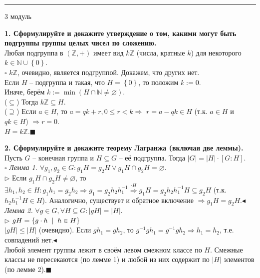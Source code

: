 \documentclass[11pt,a4paper]{article}
\newcommand{\N}{\mathbb{N}}
\newcommand{\Z}{\mathbb{Z}}
\renewcommand{\mid}{\hspace{2mm}\middle|\hspace{2mm}}
\newcommand{\proof}{$\square$ }
\newcommand{\qed}{\hfill$\blacksquare$}
\begin{document}
\rule{\linewidth}{0.3mm}

\vspace{1mm}
\begin{center}
\begin{LARGE}
\textsf{3 модуль}
\end{LARGE}
\end{center}
\vspace{1mm}

\textbf{1. Сформулируйте и докажите утверждение о том, какими могут быть подгруппы группы целых чисел по сложению.\\}
Любая подгруппа в $\left( \Z, + \right)$ имеет вид $k\Z$ (числа, кратные $k$) для некоторого $k \in \N \cup \left\{ 0 \right\}$.\\
\proof $k\Z$, очевидно, является подгруппой. Докажем, что других нет.\\
Если $H$ -- подгруппа и такая, что $H = \left\{ 0 \right\}$, то положим $k := 0$.\\
Иначе, берём $k := \min\left(H \cap \N \neq \varnothing \right)$.\\
($\subseteq$) Тогда $k\Z \subseteq H$.\\
($\supseteq$) Если $a \in H$, то $a = qk + r, 0 \leq r < k \Rightarrow$ $r = a - qk \in H$ (т.к. $a \in H$ и $qk \in H$) $\Rightarrow r = 0$.\\
$H = k\Z$.\qed

\textbf{2. Сформулируйте и докажите теорему Лагранжа (включая две леммы).\\}
Пусть $G$ -- конечная группа и $H \subseteq G$ -- её подгруппа. Тогда $\left\vert G \right\vert = \left\vert H \right\vert \cdot \left[ G : H \right]$.\\
\proof \textit{Лемма 1.} $\forall g_1, g_2 \in G: g_1 H = g_2 H \vee g_1 H \cap g_2 H = \varnothing$.\\
$\triangleright$ Если $g_1 H \cap g_2 H \neq \varnothing$, то $\exists h_1, h_2 \in H : g_1 h_1 = g_2 h_2 \Rightarrow g_1 = g_2 h_2 h_1^{-1} \stackrel{\cdot H}{\Rightarrow} g_1 H = g_2 h_2 h_1^{-1} H \subseteq g_2 H$ (т.к. $h_2 h_1^{-1} H \in H$). Аналогично, существует и обратное включение $\Rightarrow g_1 H = g_2 H$.\hfill$\blacktriangleleft$ \\
\textit{Лемма 2.} $\forall g \in G, \forall H \subseteq G: |gH| = |H|$.\\
$\triangleright$ $gH = \left\{g \cdot h \mid h \in H \right\}$\\
$\left\vert gH \right\vert \leq \left\vert H \right\vert$ (очевидно). Если $g h_1 = g h_2$, то $g^{-1} g h_1 = g^{-1} g h_2 \Rightarrow h_1 = h_2$, т.е. совпадений нет.\hfill$\blacktriangleleft$ \\
Любой элемент группы лежит в своём левом смежном классе по $H$. Смежные классы не пересекаются (по лемме 1) и любой из них содержит по $\left\vert H \right\vert$ элементов (по лемме 2).\qed
\end{document}
